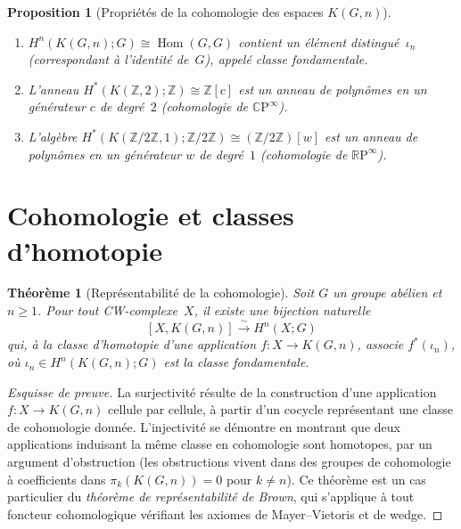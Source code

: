 \documentclass[12pt,a4paper,openany]{book}
\theoremstyle{definition}
\theoremstyle{plain}
\newtheorem{theoreme}[definition]{Théorème}
\newtheorem{proposition}[definition]{Proposition}
\theoremstyle{remark}
\newcommand{\Z}{\mathbb{Z}}
\newcommand{\RP}{\mathbb{R}\mathrm{P}}
\newcommand{\CP}{\mathbb{C}\mathrm{P}}
\DeclareMathOperator{\Hom}{Hom}
\begin{document}
\begin{proposition}[Propriétés de la cohomologie des espaces $K(G,n)$]
  \label{prop:cohomologie-KGn}
  \begin{enumerate}[label=(\roman*)]
    \item $H^n(K(G, n); G) \cong \Hom(G, G)$ contient un élément distingué~$\iota_n$
          (correspondant à l'identité de~$G$), appelé \emph{classe fondamentale}.
    \item L'anneau $H^*(K(\Z, 2); \Z) \cong \Z[c]$ est un anneau de polynômes
          en un générateur $c$ de degré~$2$ (cohomologie de $\CP^\infty$).
    \item L'algèbre $H^*(K(\Z/2\Z, 1); \Z/2\Z) \cong (\Z/2\Z)[w]$ est un anneau
          de polynômes en un générateur $w$ de degré~$1$ (cohomologie de $\RP^\infty$).
  \end{enumerate}
\end{proposition}

\section{Cohomologie et classes d'homotopie}\label{sec:representabilite}

\begin{theoreme}[Représentabilité de la cohomologie]\label{thm:representabilite-brown}
  Soit $G$ un groupe abélien et $n \geq 1$. Pour tout CW-complexe~$X$, il existe
  une bijection naturelle
  \[
    [X, K(G, n)] \xrightarrow{\;\sim\;} H^n(X; G)
  \]
  qui, à la classe d'homotopie d'une application $f \colon X \to K(G, n)$,
  associe $f^*(\iota_n)$, où $\iota_n \in H^n(K(G,n); G)$ est la \emph{classe
  fondamentale}.
\end{theoreme}

\begin{proof}[Esquisse de preuve]
  La surjectivité résulte de la construction d'une application $f \colon X \to K(G,n)$
  cellule par cellule, à partir d'un cocycle représentant une classe de cohomologie
  donnée. L'injectivité se démontre en montrant que deux applications induisant la
  même classe en cohomologie sont homotopes, par un argument d'obstruction
  (les obstructions vivent dans des groupes de cohomologie à coefficients dans
  $\pi_k(K(G,n)) = 0$ pour $k \neq n$). Ce théorème est un cas particulier du
  \emph{théorème de représentabilité de Brown}, qui s'applique à tout foncteur cohomologique
  vérifiant les axiomes de Mayer--Vietoris et de wedge.
\end{proof}
\end{document}
